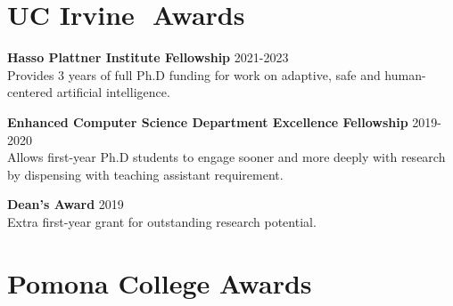 \documentclass[margin]{res}
\begin{document}
\begin{resume}
%
%

 

\section{UC Irvine\,\, Awards}

\textbf{Hasso Plattner Institute Fellowship} \hfill 2021-2023\\
Provides 3 years of full Ph.D funding for work on adaptive, safe and human-centered artificial intelligence.

\textbf{Enhanced Computer Science Department Excellence Fellowship} \hfill 2019-2020\\
Allows first-year Ph.D students to engage sooner and more deeply with research by dispensing with teaching assistant requirement.

\textbf{Dean's Award} \hfill 2019\\
Extra first-year grant for outstanding research potential.


\section{Pomona College Awards}


\end{resume}
\end{document}
